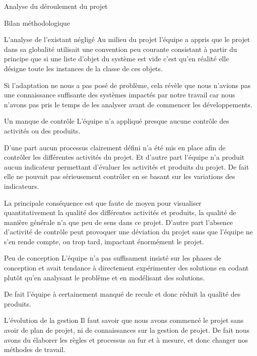 \documentclass[]{article}
\begin{document}
{\begin{section}{Analyse du déroulement du projet}
 \begin{subsection}{Bilan méthodologique}
     \begin{subsubsection}{L'analyse de l'existant négligé}
         Au milieu du projet l'équipe a appris que le projet dans sa globalité utilisait une convention peu courante consistant à partir du principe que si une liste d'objet du système est vide c'est qu'en réalité elle désigne toute les instances de la classe de ces objets.

         Si l'adaptation ne nous a pas posé de problème, cela révèle que nous n'avions pas une connaissance suffisante des systèmes impactés par notre travail car nous n'avons pas pris le temps de les analyser avant de commencer les développements.
     \end{subsubsection}

     \begin{subsubsection}{Un manque de contrôle}
         L'équipe n'a appliqué presque aucune contrôle des activités ou des produits.

         D'une part aucun processus clairement défini n'a été mis en place afin de contrôler les différentes activités du projet. Et d'autre part l'équipe n'a produit aucun indicateur permettant d'évaluer les activités et produits du projet. De fait elle ne pouvait pas sérieusement contrôler en se basant sur les variations des indicateurs.

         La principale conséquence est que faute de moyen pour visualiser quantitativement la qualité des différentes activités et produits, la qualité de manière générale n'a que peu de sens dans ce projet. D'autre part l'absence d'activité de contrôle peut provoquer une déviation du projet sans que l'équipe ne s'en rende compte, ou trop tard, impactant énormément le projet.
     \end{subsubsection}

     \begin{subsubsection}{Peu de conception}
         L'équipe n'a pas suffisament insisté sur les phases de conception et avait tendance à directement expérimenter des solutions en codant plutôt qu'en analysant le problème et en modélisant des solutions.

         De fait l'équipe à certainement manqué de recule et donc réduit la qualité des produits.
     \end{subsubsection}

     \begin{subsubsection}{L'évolution de la gestion}
         Il faut savoir que nous avons commencé le projet sans avoir de plan de projet, ni de connaissances sur la gestion de projet. De fait nous avons du élaborer les règles et processus au fur et à mesure, et donc changer nos méthodes de travail.


\end{subsubsection}
\end{subsection}
\end{section}}
\end{document}
